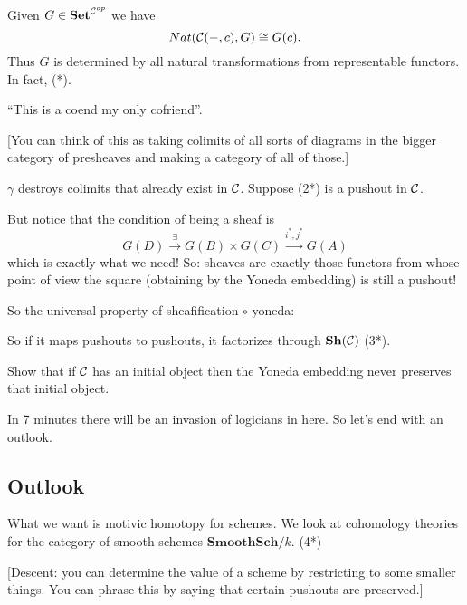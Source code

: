 \documentclass[../MH_Total.tex]{subfiles}
\begin{document}
\begin{center}
\end{center}

Given $G \in \mathbf{Set}^{\mathcal{C}^{op}}$ we have
\[
Nat(\mathcal{C}(-,c),G) \cong G(c).
\]
Thus $G$ is determined by all natural transformations from representable functors. In fact, (*).

``This is a coend my only cofriend''. 

[You can think of this as taking colimits of all sorts of diagrams in the bigger category of presheaves and making a category of all of those.] 

$\gamma$ destroys colimits that already exist in $\mathcal{C}$. Suppose (2*) is a pushout in $\mathcal{C}$. 

But notice that the condition of being a sheaf is
\[
G(D) \xrightarrow{\exists} G(B) \times G(C) \xrightarrow{i^*,j^*} G(A)
\]
which is exactly what we need! So: sheaves are exactly those functors from whose point of view the square (obtaining by the Yoneda embedding) is still a pushout!

So the universal property of sheafification $\circ$ yoneda:

So if it maps pushouts to pushouts, it factorizes through $\mathbf{Sh}(\mathcal{C})$ (3*). 

\begin{exercise}
Show that if $\mathcal{C}$ has an initial object then the Yoneda embedding never preserves that initial object. 	
\end{exercise}

In 7 minutes there will be an invasion of logicians in here. So let's end with an outlook.

\subsection{Outlook}
What we want is motivic homotopy for schemes. We look at cohomology theories for the category of smooth schemes $\mathbf{SmoothSch}/k$. (4*)

[Descent: you can determine the value of a scheme by restricting to some smaller things. You can phrase this by saying that certain pushouts are preserved.]
\end{document}
